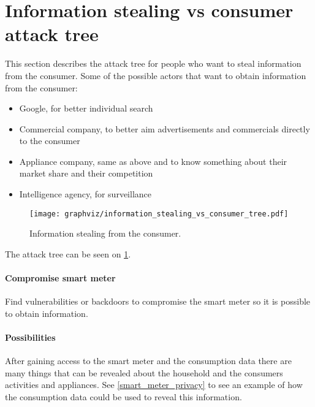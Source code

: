 \section{Information stealing vs consumer attack tree}
This section describes the attack tree for people who want to steal information from the consumer.
Some of the possible actors that want to obtain information from the consumer:
\begin{itemize}
\item Google, for better individual search
\item Commercial company, to better aim advertisements and commercials directly to the consumer
\item Appliance company, same as above and to know something about their market share and their competition
\item Intelligence agency, for surveillance
\end{itemize}

\begin{figure}
  \begin{center}
    \texttt{[image: graphviz/information\_stealing\_vs\_consumer\_tree.pdf]}
  \end{center}
  \caption{Information stealing from the consumer.}
  \label{information_stealing_tree}
\end{figure}

The attack tree can be seen on \cref{information_stealing_tree}.

\paragraph{Compromise smart meter}
Find vulnerabilities or backdoors to compromise the smart meter so it is possible to obtain information.

\paragraph{Possibilities}
After gaining access to the smart meter and the consumption data there are many things that can be revealed about the household and the consumers activities and appliances.
See \cref{smart_meter_privacy} to see an example of how the consumption data could be used to reveal this information.
